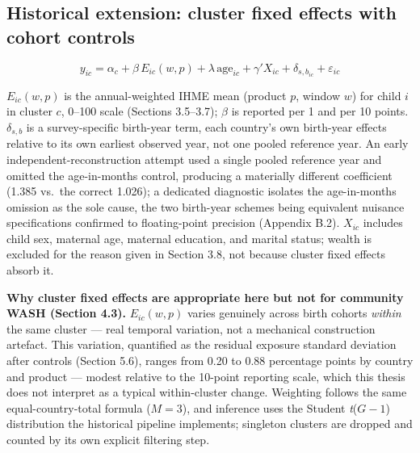 \subsection{Historical extension: cluster fixed effects with cohort controls}\label{sec:4.6}

\[y_{ic} = \alpha_c + \beta\,E_{ic}(w, p) + \lambda\,\text{age}_{ic} + \gamma'X_{ic} + \delta_{s,b_{ic}} + \varepsilon_{ic}\]

\(E_{ic}(w,p)\) is the annual-weighted IHME mean (product \(p\), window \(w\)) for child \(i\) in cluster \(c\), 0--100 scale (Sections 3.5--3.7); \(\beta\) is reported per 1 and per 10 points. \(\delta_{s,b}\) is a survey-specific birth-year term, each country's own birth-year effects relative to its own earliest observed year, not one pooled reference year. An early independent-reconstruction attempt used a single pooled reference year and omitted the age-in-months control, producing a materially different coefficient (1.385 vs.~the correct 1.026); a dedicated diagnostic isolates the age-in-months omission as the sole cause, the two birth-year schemes being equivalent nuisance specifications confirmed to floating-point precision (Appendix B.2). \(X_{ic}\) includes child sex, maternal age, maternal education, and marital status; wealth is excluded for the reason given in Section 3.8, not because cluster fixed effects absorb it.

\textbf{Why cluster fixed effects are appropriate here but not for community WASH (Section 4.3).} \(E_{ic}(w,p)\) varies genuinely across birth cohorts \emph{within} the same cluster --- real temporal variation, not a mechanical construction artefact. This variation, quantified as the residual exposure standard deviation after controls (Section 5.6), ranges from 0.20 to 0.88 percentage points by country and product --- modest relative to the 10-point reporting scale, which this thesis does not interpret as a typical within-cluster change. Weighting follows the same equal-country-total formula (\(M=3\)), and inference uses the Student \emph{t}(\(G-1\)) distribution the historical pipeline implements; singleton clusters are dropped and counted by its own explicit filtering step.
